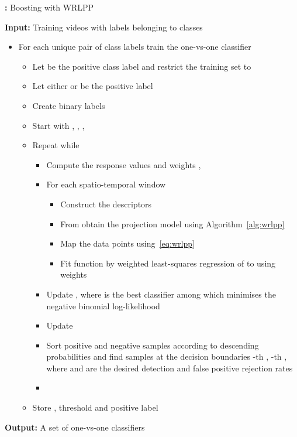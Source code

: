 \documentclass[10pt,twocolumn,letterpaper]{article}
\newcommand{\alg}[1]{\mbox{Algorithm~\ref{#1}}}
\begin{document}
\begin{algorithm}
  \footnotesize
  \raggedright
  \caption{{\bf :} {\footnotesize Boosting with WRLPP}}
  \label{alg:logitboost}
  
  \textbf{Input:} Training videos with labels  belonging to  classes\\
  
  \begin{itemize} \leftskip-1em
    \item For each unique pair of class labels  train the one-vs-one classifier 
      \begin{itemize} \leftskip-1em
        \item Let  be the positive class label and restrict the training set to
              
        \item Let either  or  be the positive label 
        \item Create binary labels 
        \item Start with , , , 
        \item Repeat while 
          \begin{itemize} \leftskip-1em
            \item Compute the response values and weights , 
            \item For each spatio-temporal window 
              \begin{itemize} \leftskip-2em
                \item Construct the descriptors 
                \item From  obtain the projection model  using \alg{alg:wrlpp}
                \item Map the data points  using~\eqref{eq:wrlpp}
                \item Fit function  by weighted least-squares regression of  to  using weights 
              \end{itemize}
            \item Update , where  is the best classifier among  which
                  minimises the negative binomial log-likelihood 
            \item Update 
            \item Sort positive and negative samples according to descending probabilities and find samples at the decision boundaries
                  -th , -th , where  and  are the desired detection and false positive
                  rejection rates
            \item 
          \end{itemize}
        \item Store , threshold  and positive label 
      \end{itemize}
  \end{itemize}
  
  \textbf{Output:} A set of  one-vs-one classifiers
\end{algorithm}
\end{document}
